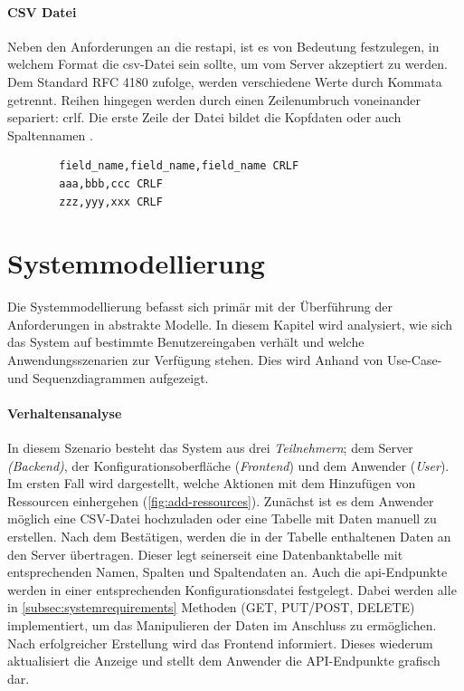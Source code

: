 \paragraph{CSV Datei} Neben den Anforderungen an die \gls{restapi}, ist es von Bedeutung festzulegen, in welchem Format die \gls{csv}-Datei sein sollte, um vom Server akzeptiert zu werden. Dem Standard RFC 4180 zufolge, werden verschiedene Werte durch Kommata getrennt. Reihen hingegen werden durch einen Zeilenumbruch voneinander separiert: \gls{crlf}. Die erste Zeile der Datei bildet die Kopfdaten oder auch Spaltennamen \cite{nwg.csv.1999}.

\begin{verbatim}
        field_name,field_name,field_name CRLF
        aaa,bbb,ccc CRLF
        zzz,yyy,xxx CRLF
\end{verbatim}


\section{Systemmodellierung} \label{sec:systemmodeling}
Die Systemmodellierung befasst sich primär mit der Überführung der Anforderungen in abstrakte Modelle. In diesem Kapitel wird analysiert, wie sich das System auf bestimmte Benutzereingaben verhält und welche Anwendungsszenarien zur Verfügung stehen. Dies wird Anhand von Use-Case- und Sequenzdiagrammen aufgezeigt. \cite{Sommerville.2016}

\paragraph{Verhaltensanalyse} In diesem Szenario besteht das System aus drei \textit{Teilnehmern}; dem Server \textit{(Backend)}, der Konfigurationsoberfläche (\textit{Frontend}) und dem Anwender (\textit{User}). Im ersten Fall wird dargestellt, welche Aktionen mit dem Hinzufügen von Ressourcen einhergehen (\autoref{fig:add-ressources}). Zunächst ist es dem Anwender möglich eine CSV-Datei hochzuladen oder eine Tabelle mit Daten manuell zu erstellen. Nach dem Bestätigen, werden die in der Tabelle enthaltenen Daten an den Server übertragen. Dieser legt seinerseit eine Datenbanktabelle mit entsprechenden Namen, Spalten und Spaltendaten an. Auch die \gls{api}-Endpunkte werden in einer entsprechenden Konfigurationsdatei festgelegt. Dabei werden alle in \autoref{subsec:systemrequirements} Methoden (GET, PUT/POST, DELETE) implementiert, um das Manipulieren der Daten im Anschluss zu ermöglichen. Nach erfolgreicher Erstellung wird das Frontend informiert. Dieses wiederum aktualisiert die Anzeige und stellt dem Anwender die API-Endpunkte grafisch dar.

